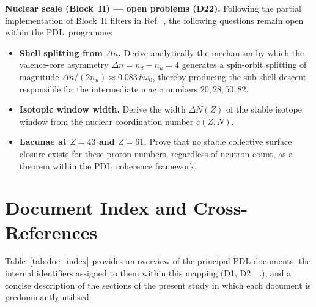 \documentclass[11pt,a4paper]{article}
\newcommand{\PDL}{\textnormal{PDL}}
\begin{document}
\medskip\noindent\textbf{Nuclear scale (Block~II) --- open problems (D22).} Following the partial implementation of Block~II filters in Ref.~\citep{Nuclear_Stability_PDL_2026}, the following questions remain open within the \PDL\ programme:
\begin{itemize}
  \item \textbf{Shell splitting from $\Delta n$.} Derive analytically the mechanism by which the valence-core asymmetry $\Delta n = n_d - n_u = 4$ generates a spin-orbit splitting of magnitude $\Delta n/(2n_u) \approx 0.083\,\hbar\omega_0$, thereby producing the sub-shell descent responsible for the intermediate magic numbers $20, 28, 50, 82$.
  \item \textbf{Isotopic window width.} Derive the width $\Delta N(Z)$ of the stable isotope window from the nuclear coordination number $c(Z,N)$.
  \item \textbf{Lacunae at $Z = 43$ and $Z = 61$.} Prove that no stable collective surface closure exists for these proton numbers, regardless of neutron count, as a theorem within the \PDL\ coherence framework.
\end{itemize}

\newpage

\appendix

\section{Document Index and Cross-References}
\label{app:doc_index}

Table~\ref{tab:doc_index} provides an overview of the principal PDL documents, the internal identifiers assigned to them within this mapping (D1, D2, \dots), and a concise description of the sections of the present study in which each document is predominantly utilised.

\setlength{\LTpre}{18pt}
\setlength{\LTpost}{0pt}
\end{document}
